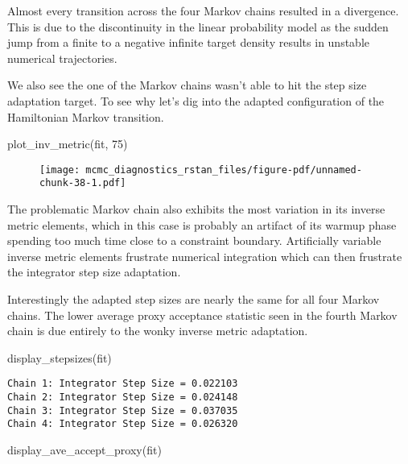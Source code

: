 \documentclass[
  letterpaper,
  DIV=11,
  numbers=noendperiod]{scrartcl}
\newenvironment{Shaded}{\begin{snugshade}}{\end{snugshade}}
\newcommand{\DecValTok}[1]{\textcolor[rgb]{0.68,0.00,0.00}{#1}}
\newcommand{\FunctionTok}[1]{\textcolor[rgb]{0.28,0.35,0.67}{#1}}
\newcommand{\NormalTok}[1]{\textcolor[rgb]{0.00,0.23,0.31}{#1}}
\begin{document}
Almost every transition across the four Markov chains resulted in a
divergence. This is due to the discontinuity in the linear probability
model as the sudden jump from a finite to a negative infinite target
density results in unstable numerical trajectories.

We also see the one of the Markov chains wasn't able to hit the step
size adaptation target. To see why let's dig into the adapted
configuration of the Hamiltonian Markov transition.

\begin{Shaded}
\begin{Highlighting}[]
\FunctionTok{plot\_inv\_metric}\NormalTok{(fit, }\DecValTok{75}\NormalTok{)}
\end{Highlighting}
\end{Shaded}

\begin{figure}[H]

{\centering \texttt{[image: mcmc\_diagnostics\_rstan\_files/figure-pdf/unnamed-chunk-38-1.pdf]}

}

\end{figure}

The problematic Markov chain also exhibits the most variation in its
inverse metric elements, which in this case is probably an artifact of
its warmup phase spending too much time close to a constraint boundary.
Artificially variable inverse metric elements frustrate numerical
integration which can then frustrate the integrator step size
adaptation.

Interestingly the adapted step sizes are nearly the same for all four
Markov chains. The lower average proxy acceptance statistic seen in the
fourth Markov chain is due entirely to the wonky inverse metric
adaptation.

\begin{Shaded}
\begin{Highlighting}[]
\FunctionTok{display\_stepsizes}\NormalTok{(fit)}
\end{Highlighting}
\end{Shaded}

\begin{verbatim}
Chain 1: Integrator Step Size = 0.022103
Chain 2: Integrator Step Size = 0.024148
Chain 3: Integrator Step Size = 0.037035
Chain 4: Integrator Step Size = 0.026320
\end{verbatim}

\begin{Shaded}
\begin{Highlighting}[]
\FunctionTok{display\_ave\_accept\_proxy}\NormalTok{(fit)}
\end{Highlighting}
\end{Shaded}
\end{document}
